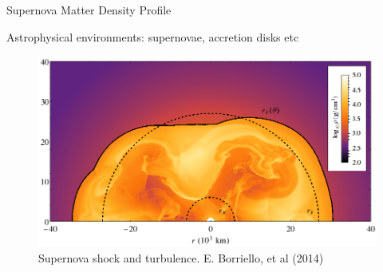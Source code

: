 \begin{frame}{Supernova Matter Density Profile}

\begin{tcolorbox}%

Astrophysical environments: supernovae, accretion disks etc

\end{tcolorbox}

\begin{figure}
    \centering
    \includegraphics[height=0.5\textheight]{assets/supernova-shock-turbulence.png}
    \caption*{Supernova shock and turbulence. E. Borriello, et al  (2014)}
\end{figure}



\end{frame}










